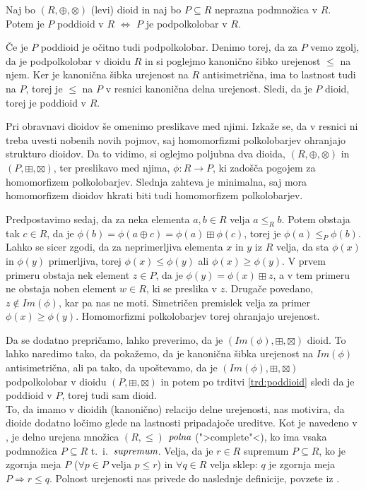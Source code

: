 \documentclass[mat1]{fmfdelo}
\newcommand{\pojem}[1]{\ensuremath{\emph{#1}}}
\newcommand{\map}[3]{\ensuremath{{#1}:{#2}\rightarrow{#3}}}
\begin{document}
\begin{trditev}
	\label{trd:poddioid}
	Naj bo $(R, \oplus, \otimes)$ (levi) dioid in naj bo $P\subseteq R$ neprazna podmnožica v $R$. Potem je $P$ poddioid v $R$ $\iff$ $P$ je podpolkolobar v $R$.
\end{trditev}

\begin{dokaz}
	Če je $P$ poddioid je očitno tudi podpolkolobar. Denimo torej, da za $P$ vemo zgolj, da je podpolkolobar v dioidu $R$ in si poglejmo kanonično šibko urejenost $\leq$ na njem. Ker je kanonična šibka urejenost na $R$ antisimetrična, ima to lastnost tudi na $P$, torej je $\leq$ na $P$ v resnici kanonična delna urejenost. Sledi, da je $P$ dioid, torej je poddioid v $R$.
\end{dokaz}

Pri obravnavi dioidov še omenimo preslikave med njimi. Izkaže se, da v resnici ni treba uvesti nobenih novih pojmov, saj homomorfizmi polkolobarjev ohranjajo strukturo dioidov. Da to vidimo, si oglejmo poljubna dva dioida, $(R, \oplus, \otimes)$ in $(P, \boxplus, \boxtimes)$, ter preslikavo med njima, $\map{\phi}{R}{P}$, ki zadošča pogojem za homomorfizem polkolobarjev. Slednja zahteva je minimalna, saj mora homomorfizem dioidov hkrati biti tudi homomorfizem polkolobarjev. 

Predpostavimo sedaj, da za neka elementa $a, b\in R$ velja $a\leq_R b$. Potem obstaja tak $c\in R$, da je $\phi(b) = \phi(a\oplus c) = \phi(a) \boxplus\phi(c)$, torej je $\phi(a) \leq_P\phi(b)$. Lahko se sicer zgodi, da za neprimerljiva elementa $x$ in $y$ iz $R$ velja, da sta $\phi(x)$ in $\phi(y)$ primerljiva, torej $\phi(x) \leq \phi(y)$ ali $\phi(x) \geq \phi(y)$. V prvem primeru obstaja nek element $z\in P$, da je $\phi(y) = \phi(x) \boxplus z$, a v tem primeru ne obstaja noben element $w\in R$, ki se preslika v $z$. Drugače povedano, $z\notin Im(\phi)$, kar pa nas ne moti. Simetričen premislek velja za primer $\phi(x) \geq \phi(y)$. Homomorfizmi polkolobarjev torej ohranjajo urejenost.

Da se dodatno prepričamo, lahko preverimo, da je $(Im(\phi), \boxplus, \boxtimes)$ dioid. To lahko naredimo tako, da pokažemo, da je kanonična šibka urejenost na $Im(\phi)$ antisimetrična, ali pa tako, da upoštevamo, da je $(Im(\phi), \boxplus, \boxtimes)$ podpolkolobar v dioidu $(P, \boxplus, \boxtimes)$ in potem po trditvi \ref{trd:poddioid} sledi da je poddioid v $P$, torej tudi sam dioid.
\newline \\
To, da imamo v dioidih (kanonično) relacijo delne urejenosti, nas motivira, da dioide dodatno ločimo glede na lastnosti pripadajoče ureditve. Kot je navedeno v \cite[str. 10]{bib:Gondran}, je delno urejena množica $(R, \leq)$ \pojem{polna }(">complete"<), ko ima vsaka podmnožica $P \subseteq R$ t.~i.~\pojem{supremum}. 
Velja, da je $r\in R$ supremum $P\subseteq R$, ko je zgornja meja $P$ ($\forall p \in P$ velja $ p \leq r$) in $\forall q \in R$ velja sklep: $q$ je zgornja meja $P \Rightarrow r \leq q$. Polnost urejenosti nas privede do naslednje definicije, povzete iz \cite[definicija 6.\,1.\,8.\,]{bib:Gondran}.
\end{document}
